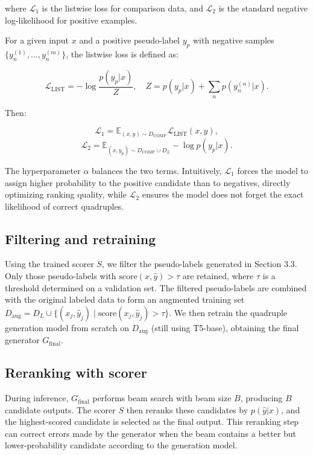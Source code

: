 \documentclass{article}
\begin{document}
where \(\mathcal{L}_1\) is the listwise loss for comparison data, and \(\mathcal{L}_2\) is the standard negative log-likelihood for positive examples.

For a given input \(x\) and a positive pseudo-label \(y_p\) with negative samples \(\{y_n^{(1)}, \dots, y_n^{(m)}\}\), the listwise loss is defined as:

\[
\mathcal{L}_{\text{LIST}} = -\log \frac{p(y_p|x)}{Z}, \quad Z = p(y_p|x) + \sum_{n} p(y_n^{(n)}|x).
\]

Then:

\[
\mathcal{L}_1 = \mathbb{E}_{(x,y) \sim D_{\text{COMP}}} \mathcal{L}_{\text{LIST}}(x,y),
\]
\[
\mathcal{L}_2 = \mathbb{E}_{(x,y_p) \sim D_{\text{COMP}} \cup D_L} -\log p(y_p|x).
\]

The hyperparameter \(\alpha\) balances the two terms. Intuitively, \(\mathcal{L}_1\) forces the model to assign higher probability to the positive candidate than to negatives, directly optimizing ranking quality, while \(\mathcal{L}_2\) ensures the model does not forget the exact likelihood of correct quadruples.

\subsection{Filtering and retraining}

Using the trained scorer \(S\), we filter the pseudo-labels generated in Section 3.3. Only those pseudo-labels with \(\text{score}(x, \hat{y}) > \tau\) are retained, where \(\tau\) is a threshold determined on a validation set. The filtered pseudo-labels are combined with the original labeled data to form an augmented training set \(D_{\text{aug}} = D_L \cup \{(x_j, \hat{y}_j) \mid \text{score}(x_j, \hat{y}_j) > \tau\}\). We then retrain the quadruple generation model from scratch on \(D_{\text{aug}}\) (still using T5-base), obtaining the final generator \(G_{\text{final}}\).

\subsection{Reranking with scorer}

During inference, \(G_{\text{final}}\) performs beam search with beam size \(B\), producing \(B\) candidate outputs. The scorer \(S\) then reranks these candidates by \(p(\hat{y}|x)\), and the highest-scored candidate is selected as the final output. This reranking step can correct errors made by the generator when the beam contains a better but lower-probability candidate according to the generation model.
\end{document}
